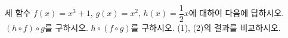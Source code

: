 \hspace*{2mm}\begin{minipage}[t]{\dimexpr\linewidth-2mm\relax}\vspace{0pt}
세 함수 $f(x)=x^3+1$, $g(x)=x^2$, $h(x)=\dfrac{1}{2}x$에 대하여 다음에 답하시오.
 $(h\circ f)\circ g$를 구하시오.
 $h\circ(f\circ g)$를 구하시오.
 (1), (2)의 결과를 비교하시오.\end{minipage}
